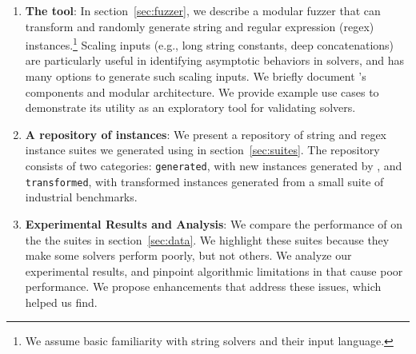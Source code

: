\begin{enumerate}
    \item \textbf{The \fuzzer{} tool}:
        In section~\ref{sec:fuzzer}, we describe a modular fuzzer that can
        transform and randomly generate \smtfull{} string and regular
        expression (regex) instances.\footnote{We assume basic
        familiarity with string solvers and their input
        language.} Scaling inputs (e.g., long string constants,
        deep concatenations) are particularly useful in identifying asymptotic
        behaviors in solvers, and \fuzzer{} has many options to generate such
        scaling inputs. We briefly document \fuzzer{}'s
        components and modular architecture. We provide example use cases to
        demonstrate its utility as an exploratory tool for validating
        solvers.

    \item \textbf{A repository of \smtfull{} instances}:
        We present a repository of \smtfull{} string and regex instance suites
        we generated using \fuzzer{} in section~\ref{sec:suites}. The
        repository consists of two categories: \texttt{generated}, with new
        instances generated by \fuzzer{}, and \texttt{transformed}, with
        transformed instances generated from a small suite of industrial
        benchmarks.

    \item \textbf{Experimental Results and Analysis}:
        We compare the performance of \theSolvers{} on the
        the \fuzzer{} suites \theSuites{} in section~\ref{sec:data}. We
        highlight these suites because they make some solvers perform poorly,
        but not others. We analyze our
        experimental results, and pinpoint algorithmic limitations
        in \us{} that cause poor performance. We propose enhancements that
        address these issues, which \fuzzer{} helped us find.
\end{enumerate}
